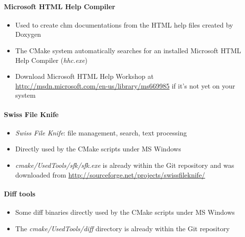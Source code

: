 \paragraph{Microsoft \ac{HTML} Help Compiler}
\begin{itemize}
\item{Used to create chm documentations from the \ac{HTML} help files created by Doxygen}
\item{The CMake system automatically searches for an installed Microsoft \ac{HTML} Help Compiler (\emph{hhc.exe})}
\item{Download Microsoft \ac{HTML} Help Workshop at \url{http://msdn.microsoft.com/en-us/library/ms669985} if it's not yet on your system}
\end{itemize}


\paragraph{Swiss File Knife}
\begin{itemize}
\item{\emph{Swiss File Knife}: file management, search, text processing}
\item{Directly used by the CMake scripts under \ac{MS} Windows}
\item{\emph{cmake/UsedTools/sfk/sfk.exe} is already within the Git repository and was downloaded from \url{http://sourceforge.net/projects/swissfileknife/}}
\end{itemize}


\paragraph{Diff tools}
\begin{itemize}
\item{Some diff binaries directly used by the CMake scripts under \ac{MS} Windows}
\item{The \emph{cmake/UsedTools/diff} directory is already within the Git repository}
\end{itemize}




